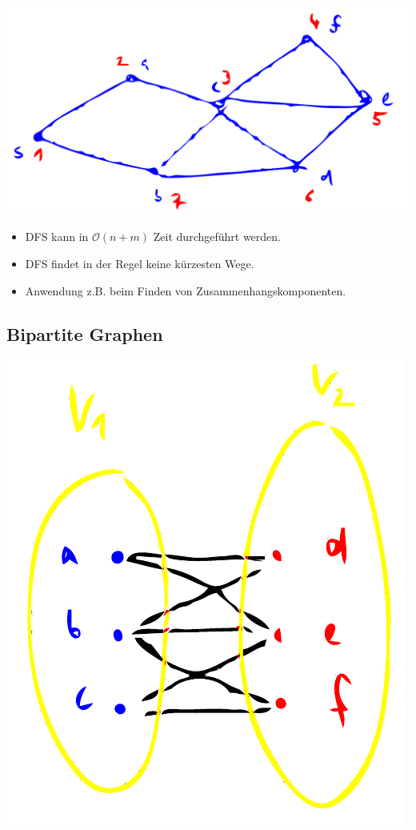 \documentclass{scrartcl}
\begin{document}
\includegraphics[width=\linewidth]{figures/dfs.pdf}

\begin{itemize}
	\item DFS kann in $ \mathcal{O}(n+m) $ Zeit durchgeführt werden.
	\item DFS findet in der Regel keine kürzesten Wege.
	\item Anwendung z.B. beim Finden von Zusammenhangskomponenten.
\end{itemize}

\subsection{Bipartite Graphen}

\includegraphics{figures/bipartiter-graph.pdf}
\end{document}
